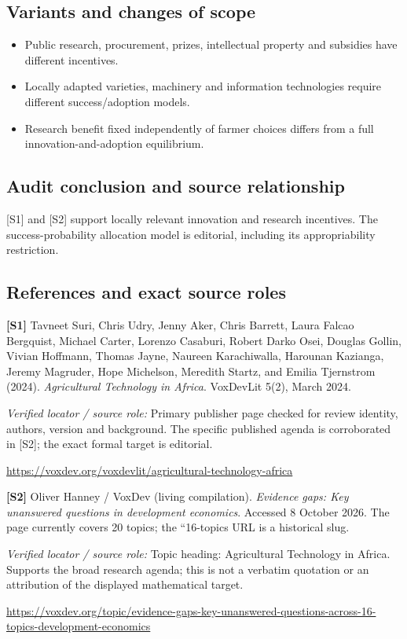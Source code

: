 \documentclass[11pt,a4paper]{article}
\begin{document}
\subsection*{Variants and changes of scope}

\begin{itemize}
\item Public research, procurement, prizes, intellectual property and subsidies have different incentives.
\item Locally adapted varieties, machinery and information technologies require different success/adoption models.
\item Research benefit fixed independently of farmer choices differs from a full innovation-and-adoption equilibrium.
\end{itemize}

\subsection*{Audit conclusion and source relationship}

[S1] and [S2] support locally relevant innovation and research incentives. The success-probability allocation model is editorial, including its appropriability restriction.

\subsection*{References and exact source roles}

{\footnotesize\raggedright
\par\noindent\textbf{[S1]} Tavneet Suri, Chris Udry, Jenny Aker, Chris Barrett, Laura Falcao Bergquist, Michael Carter, Lorenzo Casaburi, Robert Darko Osei, Douglas Gollin, Vivian Hoffmann, Thomas Jayne, Naureen Karachiwalla, Harounan Kazianga, Jeremy Magruder, Hope Michelson, Meredith Startz, and Emilia Tjernstrom (2024). \emph{Agricultural Technology in Africa}. VoxDevLit 5(2), March 2024.\par \textit{Verified locator / source role:} Primary publisher page checked for review identity, authors, version and background. The specific published agenda is corroborated in [S2]; the exact formal target is editorial.\par \url{https://voxdev.org/voxdevlit/agricultural-technology-africa}\par\smallskip
\par\noindent\textbf{[S2]} Oliver Hanney / VoxDev (living compilation). \emph{Evidence gaps: Key unanswered questions in development economics}. Accessed 8 October 2026. The page currently covers 20 topics; the ``16-topics URL is a historical slug.\par \textit{Verified locator / source role:} Topic heading: Agricultural Technology in Africa. Supports the broad research agenda; this is not a verbatim quotation or an attribution of the displayed mathematical target.\par \url{https://voxdev.org/topic/evidence-gaps-key-unanswered-questions-across-16-topics-development-economics}\par\smallskip
}
\end{document}
